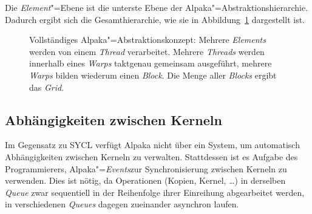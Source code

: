Die \textit{Element}"=Ebene ist die unterste Ebene der
Alpaka"=Abstraktionshierarchie. Dadurch ergibt sich die Gesamthierarchie, wie
sie in Abbildung~\ref{alpaka:konzepte:abstraktion:elements:vollstaendig}
dargestellt ist.

\begin{figure}
    \centering
    \caption{Vollständiges Alpaka"=Abstraktionskonzept: Mehrere
             \textit{Elements} werden von einem \textit{Thread} verarbeitet.
             Mehrere \textit{Threads} werden innerhalb eines \textit{Warps}
             taktgenau gemeinsam ausgeführt, mehrere \textit{Warps} bilden
             wiederum einen \textit{Block}. Die Menge aller \textit{Blocks}
             ergibt das \textit{Grid}. \cite[nach][22]{worpitz2015}}
    \label{alpaka:konzepte:abstraktion:elements:vollstaendig}
\end{figure}

\subsection{Abhängigkeiten zwischen Kerneln}
\label{alpaka:konzepte:abhaengigkeiten}

Im Gegensatz zu SYCL verfügt Alpaka nicht über ein System, um automatisch
Abhängigkeiten zwischen Kerneln zu verwalten. Stattdessen ist es Aufgabe des
Programmierers, Alpaka"=\textit{Events}zur Synchronisierung zwischen Kerneln zu
verwenden. Dies ist nötig, da Operationen (Kopien, Kernel, \ldots) in derselben
\textit{Queue} zwar sequentiell in der Reihenfolge ihrer Einreihung
abgearbeitet werden, in verschiedenen \textit{Queues} dagegen zueinander
asynchron laufen.

